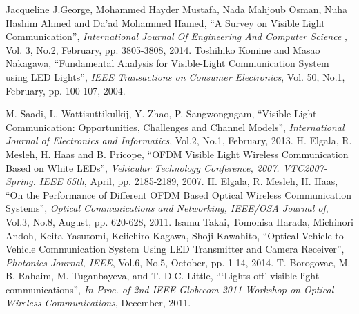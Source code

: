\begin{thebibliography}{1}

 Jacqueline J.George, Mohammed Hayder Mustafa, Nada Mahjoub Osman, Nuha Hashim Ahmed and Da’ad Mohammed Hamed, ``A Survey on Visible Light Communication'', \emph{International Journal Of Engineering And Computer Science }, Vol. 3, No.2, February, pp. 3805-3808, 2014.
 Toshihiko Komine and Masao Nakagawa, ``Fundamental Analysis for Visible-Light Communication System using LED Lights'', \emph{IEEE Transactions on Consumer Electronics}, Vol. 50, No.1, February, pp. 100-107, 2004.

 M. Saadi, L. Wattisuttikulkij, Y. Zhao, P. Sangwongngam, ``Visible Light Communication: Opportunities, Challenges and
Channel Models'', \emph{International Journal of Electronics and Informatics}, Vol.2, No.1, February, 2013.
 H. Elgala, R. Mesleh, H. Haas and B. Pricope, ``OFDM Visible Light Wireless Communication
Based on White LEDs'', \emph{Vehicular Technology Conference, 2007. VTC2007-Spring. IEEE 65th}, April, pp. 2185-2189, 2007.
 H. Elgala, R. Mesleh, H. Haas, ``On the Performance of Different OFDM Based Optical Wireless Communication Systems'', \emph{Optical Communications and Networking, IEEE/OSA Journal of}, Vol.3, No.8, August, pp. 620-628, 2011.
 Isamu Takai, Tomohisa Harada, Michinori Andoh, Keita Yasutomi, Keiichiro Kagawa, Shoji Kawahito, ``Optical Vehicle-to-Vehicle Communication System Using LED Transmitter and Camera Receiver'', \emph{Photonics Journal, IEEE}, Vol.6, No.5, October, pp. 1-14, 2014.
 T. Borogovac, M. B. Rahaim, M. Tuganbayeva, and T. D.C. Little, ``‘Lights-off’ visible light communications'', \emph{In Proc. of 2nd IEEE Globecom 2011 Workshop on Optical Wireless Communications}, December, 2011.

\end{thebibliography}
